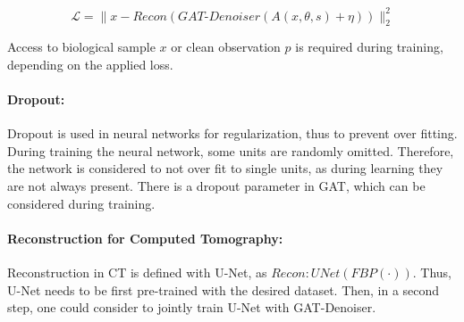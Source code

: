 \begin{equation}
  \label{eq:loss_reco}
  \mathcal{L} = \parallel x - \textit{Recon} ( \textit{GAT-Denoiser}(A(x, \theta, s) + \eta)) \parallel ^2_2
\end{equation}

Access to biological sample $x$ or clean observation $p$ is required during training, depending on the applied loss.

\paragraph{Dropout:}
Dropout is used in neural networks for regularization, thus to prevent over fitting. 
During training the neural network, some units are randomly omitted. Therefore, the network is 
considered to not over fit to single units, as during learning they are not always present.
There is a dropout parameter in GAT, which can be considered during training. 


\paragraph{Reconstruction for Computed Tomography:}
Reconstruction in CT is defined with U-Net, as $\textit{Recon} : \textit{UNet} \left( \textit{FBP} \left( \cdot \right) \right)$.
Thus, U-Net needs to be first pre-trained with the desired dataset.
Then, in a second step, one could consider to jointly train U-Net with GAT-Denoiser.